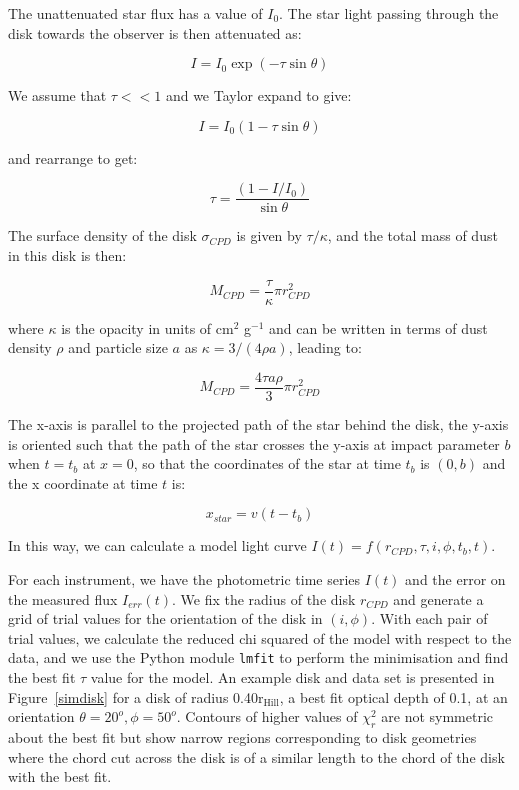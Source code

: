 \documentclass[longauth]{aa} %
\newcommand{\rhill}{$\mathrm{r_{Hill}}$} %
\begin{document}
The unattenuated star flux has a value of $I_0$.
%
The star light passing through the disk towards the observer is then attenuated as:

$$I=I_0 \exp (-\tau\sin \theta)$$

We assume that $\tau << 1$ and we Taylor expand to give:

$$I = I_0(1-\tau\sin \theta)$$

and rearrange to get:

$$\tau = \frac{(1-I/I_0)}{\sin \theta} $$

The surface density of the disk $\sigma_{CPD}$ is given by $\tau/\kappa$, and the total mass of dust in this disk is then:

$$M_{CPD}=\frac{\tau}{\kappa} \pi r_{CPD}^2$$

where $\kappa$ is the opacity in units of cm$^2$ g$^{-1}$ and can be written in terms of dust density $\rho$ and particle size $a$ as $\kappa=3/(4\rho a)$, leading to:

$$M_{CPD}= \frac{4\tau a \rho}{3} \pi r_{CPD}^2$$

The x-axis is parallel to the projected path of the star behind the disk, the y-axis is oriented such that the path of the star crosses the y-axis at impact parameter $b$ when $t = t_{b}$ at $x=0$, so that the coordinates of the star at time $t_b$ is $(0,b)$ and the x coordinate at time $t$ is:

$$x_{star} = v(t-t_{b})$$

In this way, we can calculate a model light curve $I(t)=f(r_{CPD},\tau,i,\phi,t_b,t)$.

For each instrument, we have the photometric time series $I(t)$ and the error on the measured flux $I_{err}(t)$.
%
We fix the radius of the disk $r_{CPD}$ and generate a grid of trial values for the orientation of the disk in $(i,\phi)$.
%
With each pair of trial values, we calculate the reduced chi squared of the model with respect to the data, and we use the Python module {\tt lmfit} to perform the minimisation and find the best fit $\tau$ value for the model.
%
An example disk and data set is presented in Figure~\ref{simdisk} for a disk of radius 0.40\rhill{}, a best fit optical depth of 0.1, at an orientation $\theta=20^o, \phi=50^o$.
%
Contours of higher values of $\chi_{r}^2$ are not symmetric about the best fit but show narrow regions corresponding to disk geometries where the chord cut across the disk is of a similar length to the chord of the disk with the best fit.
\end{document}
